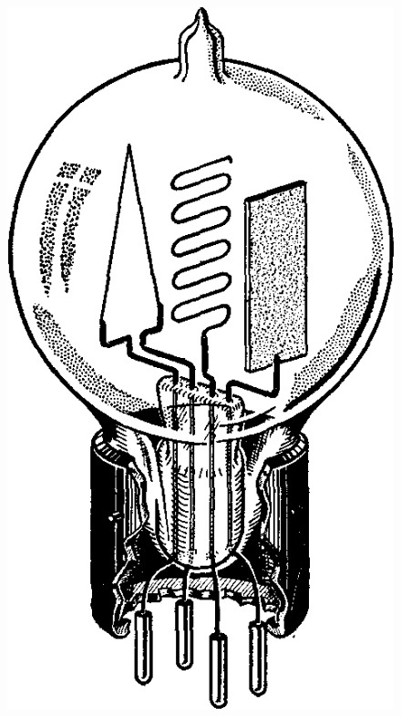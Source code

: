 \documentclass[11pt,a4paper,spanish]{beamer}
\begin{document}
\begin{frame}
\begin{minipage}{0.3\textwidth}
    \begin{figure}
        \includegraphics[width=1.0\textwidth]{img/vtube.png}
        \captionsetup{textfont=tiny,labelformat=empty}
        \caption{}
    \end{figure}

\end{minipage}

\end{frame}
\end{document}
